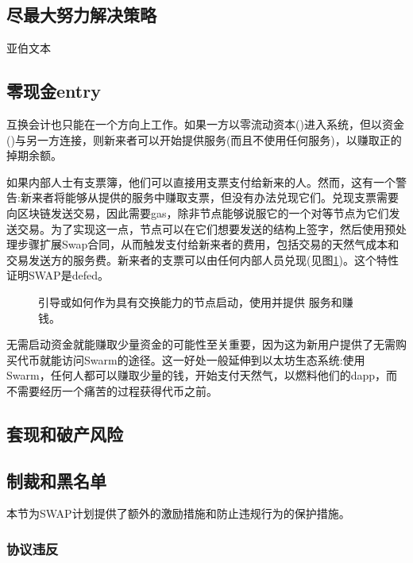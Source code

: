 \subsection{尽最大努力解决策略}

亚伯文本

\subsection{零现金entry\statusgreen}\label{sec:zero-cash-entry}


互换会计也只能在一个方向上工作。如果一方以零流动资本()进入系统，但以资金()与另一方连接，则新来者可以开始提供服务(而且不使用任何服务)，以赚取正的掉期余额。

如果内部人士有支票簿，他们可以直接用支票支付给新来的人。然而，这有一个警告:新来者将能够从提供的服务中赚取支票，但没有办法兑现它们。兑现支票需要向区块链发送交易，因此需要gas，除非节点能够说服它的一个对等节点为它们发送交易。为了实现这一点，节点可以在它们想要发送的结构上签字，然后使用预处理步骤扩展Swap合同，从而触发支付给新来者的费用，包括交易的天然气成本和交易发送方的服务费。新来者的支票可以由任何内部人员兑现(见图\ref{fig:zero-cash-entry})。这个特性证明SWAP是defed。

\begin{figure}[htbp]
\centering

\caption[零现金条目\statusorange]{引导或如何作为具有交换能力的节点启动，使用并提供
服务和赚钱。}
\label{fig:zero-cash-entry}
\end{figure}

无需启动资金就能赚取少量资金的可能性至关重要，因为这为新用户提供了无需购买代币就能访问Swarm的途径。这一好处一般延伸到以太坊生态系统:使用Swarm，任何人都可以赚取少量的钱，开始支付天然气，以燃料他们的dapp，而不需要经历一个痛苦的过程获得代币之前。 


\subsection{套现和破产风险}



\subsection{制裁和黑名单\statusgreen}\label{sec:sanctions}
\red{}

本节为SWAP计划提供了额外的激励措施和防止违规行为的保护措施。 

\subsubsection{协议违反}

